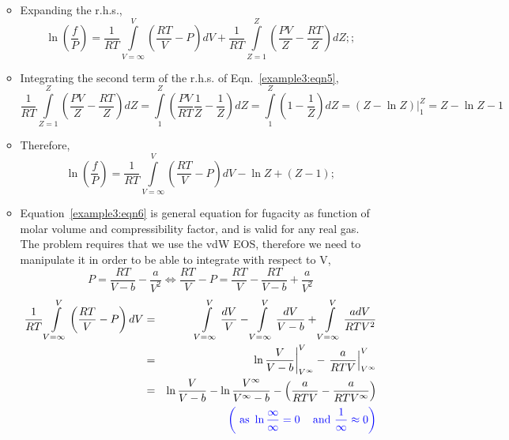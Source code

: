 \documentclass[12pts,a4paper,amsmath,amssymb,floatfix]{article}%
\newcommand{\frc}{\displaystyle\frac}
\newcommand{\blue}{\textcolor{blue}}
\begin{document}
\begin{enumerate}[label=\bfseries Example \arabic*]
\begin{itemize}
\begin{equation}
       \end{equation}
    \item Expanding the r.h.s., 
       \begin{equation}
          \ln\left(\frc{f}{P}\right) = \frc{1}{RT} \int\limits_{V=\infty}^{V}\left(\frc{RT}{V}-P\right)dV + \frc{1}{RT}\int\limits_{Z=1}^{Z}\left(\frc{PV}{Z}-\frc{RT}{Z}\right)dZ;\label{example3:eqn5};
       \end{equation}
    \item Integrating the second term of the r.h.s. of Eqn.~\ref{example3:eqn5},
       \begin{displaymath}
           \frc{1}{RT}\int\limits_{Z=1}^{Z}\left(\frc{PV}{Z}-\frc{RT}{Z}\right)dZ = \int\limits_{1}^{Z}\left(\frc{PV}{RT}\frc{1}{Z}-\frc{1}{Z}\right)dZ = \int\limits_{1}^{Z}\left(1 -\frc{1}{Z}\right)dZ = \left.\left(Z - \ln Z\right)\right|_{1}^{Z} = Z- \ln Z - 1
       \end{displaymath}
    \item Therefore,
       \begin{equation}
          \ln\left(\frc{f}{P}\right) = \frc{1}{RT} \int\limits_{V=\infty}^{V}\left(\frc{RT}{V}-P\right)dV - \ln Z + \left(Z - 1\right);\label{example3:eqn6}
       \end{equation}
    \item Equation~\ref{example3:eqn6} is general equation for fugacity as function of molar volume and compressibility factor, and is valid for any real gas. The problem requires that we use the vdW EOS, therefore we need to manipulate it in order to be able to integrate with respect to V,
        \begin{displaymath}
            P = \frc{RT}{V-b} - \frc{a}{V^{2}} \Longleftrightarrow \frc{RT}{V}-P = \frc{RT}{V}-\frc{RT}{V-b}+\frc{a}{V^{2}}
        \end{displaymath}
        \begin{eqnarray}
           \frc{1}{RT}\int\limits_{V=\infty}^{V}\left(\frc{RT}{V}-P\right)dV &=& \int\limits_{V=\infty}^{V}\frc{dV}{V} - \int\limits_{V=\infty}^{V} \frc{dV}{V-b} + \int\limits_{V=\infty}^{V} \frc{adV}{RTV^{2}} \nonumber \\
           &=& \left.\ln\frc{V}{V-b}\right|_{V^{\infty}}^{V} - \left.\frc{a}{RTV}\right|_{V^{\infty}}^{V} \nonumber \\
           &=& \ln\frc{V}{V-b} - \ln\frc{V^{\infty}}{V^{\infty}-b} - \left( \frc{a}{RTV} - \frc{a}{RTV^{\infty}}\right) \nonumber \\
           & & \blue{\left(\text{ as } \ln\frc{\infty}{\infty} = 0\;\;\; \text{ and } \frc{1}{\infty} \approx 0\right)} \nonumber \\ 

\end{eqnarray}
\end{itemize}
\end{enumerate}
\end{document}
